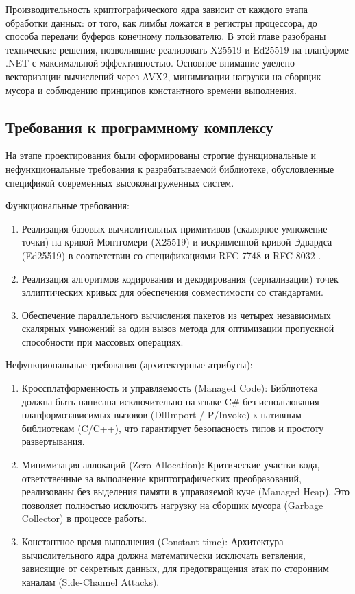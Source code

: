 Производительность криптографического ядра зависит от каждого этапа обработки данных: от того, как лимбы ложатся в регистры процессора, до способа передачи буферов конечному пользователю. В этой главе разобраны технические решения, позволившие реализовать X25519 и Ed25519 на платформе .NET с максимальной эффективностью. Основное внимание уделено векторизации вычислений через AVX2, минимизации нагрузки на сборщик мусора и соблюдению принципов константного времени выполнения.
\subsection{Требования к программному комплексу}

На этапе проектирования были сформированы строгие функциональные и нефункциональные требования к разрабатываемой библиотеке, обусловленные спецификой современных высоконагруженных систем.

Функциональные требования:
\begin{enumerate}
    \item Реализация базовых вычислительных примитивов (скалярное умножение точки) на кривой Монтгомери (X25519) и искривленной кривой Эдвардса (Ed25519) в соответствии со спецификациями RFC 7748 \cite{RFC7748} и RFC 8032 \cite{RFC8032}.
    \item Реализация алгоритмов кодирования и декодирования (сериализации) точек эллиптических кривых для обеспечения совместимости со стандартами.
    \item Обеспечение параллельного вычисления пакетов из четырех независимых скалярных умножений за один вызов метода для оптимизации пропускной способности при массовых операциях.
\end{enumerate}

Нефункциональные требования (архитектурные атрибуты):
\begin{enumerate}
    \item Кроссплатформенность и управляемость (Managed Code): Библиотека должна быть написана исключительно на языке C\# без использования платформозависимых вызовов (DllImport / P/Invoke) к нативным библиотекам (C/C++), что гарантирует безопасность типов и простоту развертывания.
    \item Минимизация аллокаций (Zero Allocation): Критические участки кода, ответственные за выполнение криптографических преобразований, реализованы без выделения памяти в управляемой куче (Managed Heap). Это позволяет полностью исключить нагрузку на сборщик мусора (Garbage Collector) в процессе работы.   
    \item Константное время выполнения (Constant-time): Архитектура вычислительного ядра должна математически исключать ветвления, зависящие от секретных данных, для предотвращения атак по сторонним каналам (Side-Channel Attacks).
\end{enumerate}

